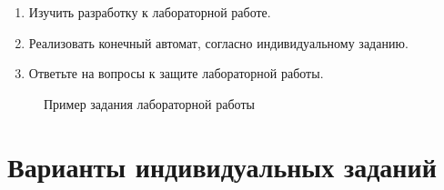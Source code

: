 \begin{enumerate}[noitemsep,topsep=0pt, after=\vspace{2pt}]
\item{Изучить разработку к лабораторной работе.}
\item{Реализовать конечный автомат, согласно индивидуальному заданию.}
\item{Ответьте на вопросы к защите лабораторной работы.}
\end{enumerate}


\begin{figure}[H]
  \centering
  \def\svgwidth{\columnwidth}
  
  \caption{Пример задания лабораторной работы}
\end{figure}


\clearpage
\section{Варианты индивидуальных заданий}


